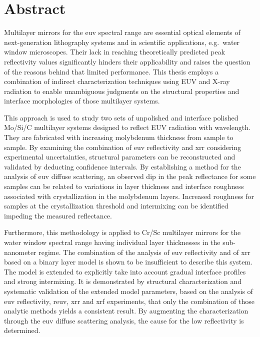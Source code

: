 \section*{Abstract}

\thispagestyle{empty}

    Multilayer mirrors for the \gls{euv} spectral range are essential optical elements of next-generation lithography systems and in scientific applications, e.g.~water window microscopes. Their lack in reaching theoretically predicted peak reflectivity values significantly hinders their applicability and raises the question of the reasons behind that limited performance. This thesis employs a combination of indirect characterization techniques using EUV and X-ray radiation to enable unambiguous judgments on the structural properties and interface morphologies of those multilayer systems.
    
    This approach is used to study two sets of unpolished and interface polished Mo/Si/C multilayer systems designed to reflect EUV radiation with  wavelength. They are fabricated with increasing molybdenum thickness from sample to sample. By examining the combination of \gls{euv} reflectivity and \gls{xrr} considering experimental uncertainties, structural parameters can be reconstructed and validated by deducting confidence intervals. By establishing a method for the analysis of \gls{euv} diffuse scattering, an observed dip in the peak reflectance for some samples can be related to variations in layer thickness and interface roughness associated with crystallization in the molybdenum layers. Increased roughness for samples at the crystallization threshold and intermixing can be identified impeding the measured reflectance.
    
    Furthermore, this methodology is applied to Cr/Sc multilayer mirrors for the water window spectral range having individual layer thicknesses in the sub-nanometer regime. The combination of the analysis of \gls{euv} reflectivity and of \gls{xrr} based on a binary layer model is shown to be insufficient to describe this system. The model is extended to explicitly take into account gradual interface profiles and strong intermixing. It is demonstrated by structural characterization and systematic validation of the extended model parameters, based on the analysis of \gls{euv} reflectivity, \gls{reuv}, \gls{xrr} and \gls{xrf} experiments, that only the combination of those analytic methods yields a consistent result. By augmenting the characterization through the \gls{euv} diffuse scattering analysis, the cause for the low reflectivity is determined.

